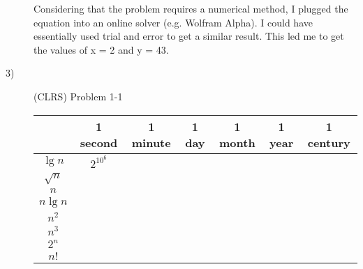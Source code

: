 \documentclass[paper=a4, fontsize=11pt]{scrartcl} %
\numberwithin{equation}{section} %
\numberwithin{figure}{section} %
\numberwithin{table}{section} %
\begin{document}
\begin{description}
        Considering that the problem requires a numerical method, I plugged the equation into an online
        solver (e.g. Wolfram Alpha). I could have essentially used trial and error to get a similar result. 
        This led me to get the values of x = 2 and y = 43.
    \item[3)] (CLRS) Problem 1-1 \hfill \\
        \begin{tabular}{ c | c | c | c | c | c | c }
                        & 1 second & 1 minute & 1 day & 1 month & 1 year & 1 century \\
            \hline
            $\lg{n}$    & $2^{10^6}$ & & & & & \\
            $\sqrt{n}$  & & & & & & \\
            $n$         & & & & & & \\
            $n\lg{n}$   & & & & & & \\
            $n^2$       & & & & & & \\
            $n^3$       & & & & & & \\
            $2^n$       & & & & & & \\
            $n!$        & & & & & & \\


\end{tabular}
\end{description}
\end{document}
